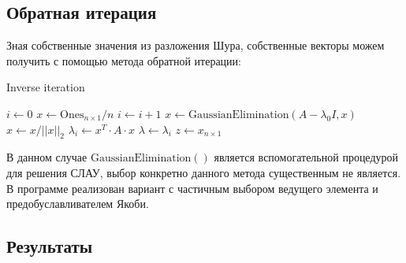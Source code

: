 \documentclass[a4paper,14pt]{extarticle}
\renewcommand{\epsilon}{\varepsilon}
\begin{document}
\subsection{Обратная итерация}

Зная собственные значения из разложения Шура, собственные векторы можем получить с помощью метода обратной итерации:

\vspace{8pt}
\begin{algorithm}[H]
\caption{Inverse iteration}
\vspace{4pt}
$i \gets 0$\;
$x \gets \mathrm{Ones}_{n \times 1} / n$ 
\Repeat{$|\lambda_i - \lambda_{i-1}| < \epsilon$} {
	$i \gets i + 1$\;
	$x \gets \mathrm{GaussianElimination}(A - \lambda_0 I, x)$\;
	$x \gets x / ||x||_2$ 
	$\lambda_i \gets x^T \cdot A \cdot x$\;
}
$\lambda \gets \lambda_i$\;
$z \gets x_{n \times 1}$\;
\end{algorithm}
\vspace{8pt}

\noindent В данном случае $\mathrm{GaussianElimination}()$ является вспомогательной процедурой для решения СЛАУ, выбор конкретно данного метода существенным не является. В программе реализован вариант с частичным выбором ведущего элемента и предобуславливателем Якоби.

\subsection{Результаты}
\end{document}
